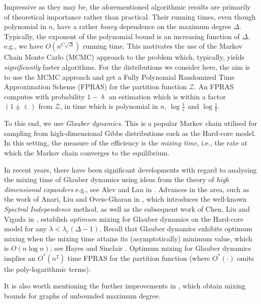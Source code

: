 \documentclass[11pt,reqno]{amsart}
\numberwithin{equation}{section}
\newcommand{\maxDeg}{{\Delta}}
\newcommand{\PartFun}{\mathcal{Z}}
\newcommand{\lcritical}{{\lambda_c}}
\begin{document}
Impressive as they may be,  the aforementioned algorithmic results are primarily of theoretical importance rather than 
practical. Their running times, even though polynomial in $n$, have a rather {\em heavy} dependence on the maximum 
degree $\maxDeg$. Typically, the exponent of the polynomial bound is an increasing function of $\maxDeg$, e.g., we  
have $O(n^{C \sqrt{\maxDeg}})$  running time.  
%
This motivates the  use of the Markov Chain Monte Carlo (MCMC) approach to the problem which, typically, 
yields {\em significantly} faster  algorithms.
% 
For the distributions we consider here, the aim is to use the MCMC approach and get a Fully Polynomial  Randomized Time 
Approximation Scheme  (FPRAS)   for the partition function  $\PartFun$.   An FPRAS  computes with probability $1-\updelta$ an 
estimation   which is within a factor  $(1\pm \upepsilon)$ from $\PartFun$, in time which is polynomial 
in  $n$, $\log \frac{1}{\upepsilon}$  and $\log\frac{1}{\updelta}$. 



To this end,  we use {\em Glauber dynamics}. This  is a popular Markov chain utilised for sampling from high-dimensional 
Gibbs distributions  such as the Hard-core model. In this setting,  the measure of the efficiency  is the {\em mixing time}, 
i.e., the rate at which the Markov chain converges to the equilibrium. 



In recent years, there have been significant developments with regard to analysing the mixing time of
Glauber dynamics using ideas from the theory of {\em high dimensional expanders}  e.g., see Alev and Lau in \cite{FirstSpInd}. 
Advances in the area, such as the work of Anari, Liu and Oveis-Gharan in \cite{OptMCMCIS}, which 
introduces the well-known {\em Spectral Independence} method, as well as the subsequent %
work of Chen, Liu and Vigoda in \cite{VigodaSpectralIndB}, establish {\em optimum} mixing 
for Glauber  dynamics on the Hard-core model for any $\lambda<\lcritical(\maxDeg-1)$.  Recall that  Glauber 
dynamics exhibits  optimum mixing when the mixing time attains its (asymptotically) minimum value, which 
is $O(n\log n)$; see  Hayes and Sinclair \cite{OptMixingTime}.   
%
Optimum mixing for Glauber dynamics  implies an $O^*(n^2)$ time FPRAS for the  partition function (where $O^*(\cdot)$ 
omits the poly-logarithmic terms). 




It is also worth mentioning the further improvements in \cite{WeimingCoUbboundedDelta,FastMCMCLocalisation},  
which obtain mixing bounds for graphs of unbounded  maximum degree. 
\end{document}
